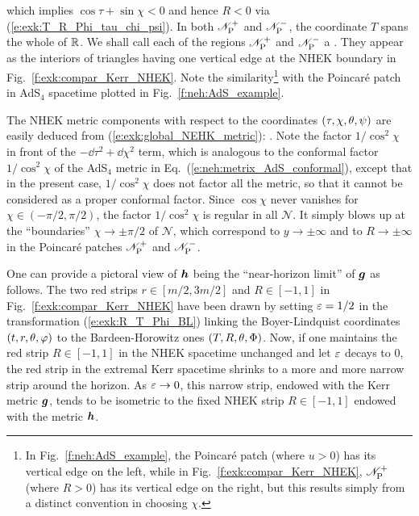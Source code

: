 which implies $\cos\tau + \sin\chi < 0$ and hence $R<0$ via (\ref{e:exk:T_R_Phi_tau_chi_psi}).
In both $\mathscr{N}_{\rm P}^+$
and $\mathscr{N}_{\rm P}^-$, the coordinate $T$ spans the whole of $\mathbb{R}$.
We shall call each of the regions $\mathscr{N}_{\rm P}^+$
and $\mathscr{N}_{\rm P}^-$  a .
They appear as the interiors of triangles having one vertical edge at the NHEK
boundary in Fig.~\ref{f:exk:compar_Kerr_NHEK}. Note the similarity\footnote{In
Fig.~\ref{f:neh:AdS_example}, the Poincaré patch (where $u>0$)
has its vertical edge on the left, while in Fig.~\ref{f:exk:compar_Kerr_NHEK},
$\mathscr{N}_{\rm P}^+$ (where $R>0$) has its vertical edge on the right, but this results simply
from a distinct convention in choosing $\chi$.}
with the Poincaré patch in AdS$_4$ spacetime plotted in Fig.~\ref{f:neh:AdS_example}.

The NHEK metric components with respect to the coordinates
$(\tau,\chi,\theta,\psi)$ are easily deduced from
(\ref{e:exk:global_NEHK_metric}):
\be
     .
\ee
Note the factor $1/\cos^2\chi$ in front of the
$- \dd \tau^2 + \dd \chi^2$ term, which is analogous to the conformal factor
$1/\cos^2\chi$ of the AdS$_4$ metric in Eq.~(\ref{e:neh:metrix_AdS_conformal}),
except that in the present case, $1/\cos^2\chi$ does not factor all the
metric, so that it cannot be considered as a proper conformal factor. Since $\cos\chi$ never vanishes
for $\chi\in(-\pi/2, \pi/2)$,
the factor $1/\cos^2\chi$ is regular in all $\mathscr{N}$. It simply blows up
at the ``boundaries'' $\chi\to \pm \pi/2$ of $\mathscr{N}$,
which correspond to $y\to \pm\infty$ and to $R\to \pm\infty$ in the Poincaré patches
$\mathscr{N}_{\rm P}^+$ and $\mathscr{N}_{\rm P}^-$.

One can provide a pictoral view of $\bm{h}$ being the ``near-horizon limit'' of $\bm{g}$ as follows.
The two red strips $r\in[m/2, 3m/2]$ and $R\in[-1, 1]$
in Fig.~\ref{f:exk:compar_Kerr_NHEK} have been drawn by setting
$\varepsilon=1/2$ in the transformation (\ref{e:exk:R_T_Phi_BL}) linking the Boyer-Lindquist coordinates
$(t,r,\theta,\varphi)$ to the Bardeen-Horowitz ones $(T,R,\theta,\Phi)$. Now, if one maintains
the red strip $R\in[-1, 1]$ in the NHEK spacetime unchanged and let $\varepsilon$ decays to $0$,
the red strip in the extremal Kerr spacetime  shrinks to a more and more narrow strip
around the horizon. As $\varepsilon\to 0$, this narrow strip, endowed with the Kerr metric $\bm{g}$, tends
to be isometric to the fixed NHEK strip $R\in[-1, 1]$ endowed with the metric $\bm{h}$.

